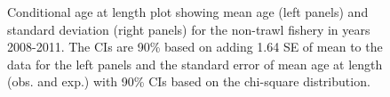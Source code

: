 \documentclass[
]{scrartcl}
\begin{document}
\begin{figure}[H]


\caption{\label{fig-call-plot-nt1}Conditional age at length plot showing
mean age (left panels) and standard deviation (right panels) for the
non-trawl fishery in years 2008-2011. The CIs are 90\% based on adding
1.64 SE of mean to the data for the left panels and the standard error
of mean age at length (obs. and exp.) with 90\% CIs based on the
chi-square distribution.}

\end{figure}%
\end{document}
